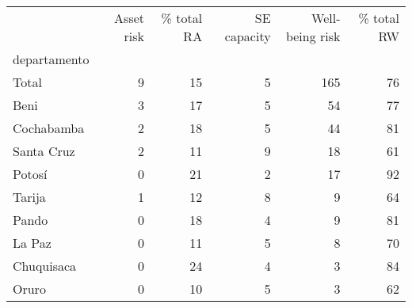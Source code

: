 \begin{tabular}{lrrrrr}
\toprule
{} &  Asset risk &  \% total RA &  SE capacity &  Well-being risk &  \% total RW \\
departamento &             &             &              &                  &             \\
\midrule
Total        &           9 &          15 &            5 &              165 &          76 \\
Beni         &           3 &          17 &            5 &               54 &          77 \\
Cochabamba   &           2 &          18 &            5 &               44 &          81 \\
Santa Cruz   &           2 &          11 &            9 &               18 &          61 \\
Potosí       &           0 &          21 &            2 &               17 &          92 \\
Tarija       &           1 &          12 &            8 &                9 &          64 \\
Pando        &           0 &          18 &            4 &                9 &          81 \\
La Paz       &           0 &          11 &            5 &                8 &          70 \\
Chuquisaca   &           0 &          24 &            4 &                3 &          84 \\
Oruro        &           0 &          10 &            5 &                3 &          62 \\
\bottomrule
\end{tabular}
